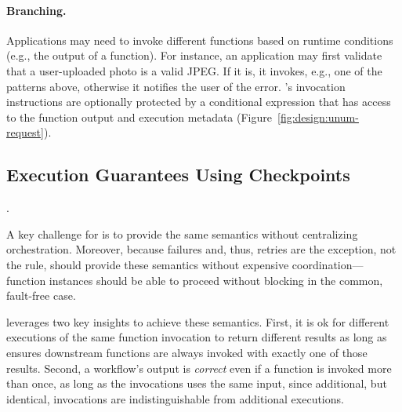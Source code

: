 \paragraph{Branching.}
Applications may need to invoke different functions based on runtime conditions
(e.g., the output of a function). For instance, an application may first
validate that a user-uploaded photo is a valid JPEG. If it is, it invokes, e.g.,
one of the patterns above, otherwise it notifies the user of the error.
\name{}'s invocation instructions are optionally protected by a conditional
expression that has access to the function output and execution metadata
(Figure~\ref{fig:design:unum-request}).



\subsection{Execution Guarantees Using Checkpoints}\label{sec:design:execution}


.

A key challenge for \name{} is to provide the same semantics without
centralizing orchestration. Moreover, because failures and, thus, retries are
the exception, not the rule, \name{} should provide these semantics without
expensive coordination---function instances should be able to proceed without
blocking in the common, fault-free case.

\name{} leverages two key insights to achieve these semantics.  First, it is ok
for different executions of the same function invocation to return different
results as long as \name{} ensures downstream functions are always invoked
with exactly one of those results. Second, a workflow's output is
\emph{correct} even if a function is invoked more than once, as long as the
invocations uses the same input, since additional, but identical, invocations
are indistinguishable from additional executions.

